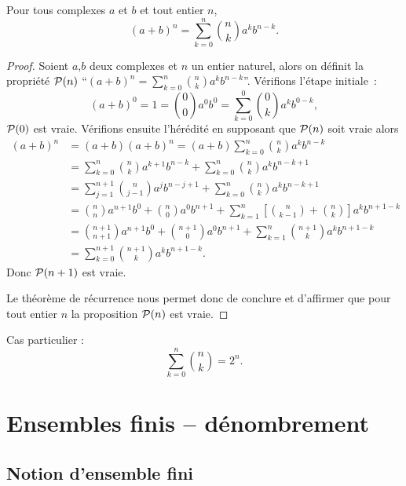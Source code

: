 \begin{prop}
  Pour tous complexes $a$ et $b$ et tout entier $n$,
  \begin{equation}
    (a+b)^n=\sum_{k=0}^n \binom{n}{k}a^kb^{n-k}.
  \end{equation}
\end{prop}
\begin{proof}
  Soient $a$,$b$ deux complexes et $n$ un entier naturel, alors on définit la propriété $\P(n)$ ``$(a+b)^n=\sum_{k=0}^n \binom{n}{k}a^kb^{n-k}$''. Vérifions l'étape initiale~:
\begin{equation}
  (a+b)^0=1=\binom{0}{0}a^0b^0=\sum_{k=0}^0 \binom{0}{k}a^kb^{0-k},
\end{equation}
$\P(0)$ est vraie. Vérifions ensuite l'hérédité en supposant que $\P(n)$ soit vraie alors
\begin{align}
  (a+b)^n&=(a+b)(a+b)^n=(a+b)\sum_{k=0}^n \binom{n}{k}a^kb^{n-k}\\
  &=\sum_{k=0}^n \binom{n}{k}a^{k+1}b^{n-k}+\sum_{k=0}^n \binom{n}{k}a^kb^{n-k+1}\\
  &=\sum_{j=1}^{n+1} \binom{n}{j-1}a^{j}b^{n-j+1}+\sum_{k=0}^n \binom{n}{k}a^kb^{n-k+1}\\
  &=\binom{n}{n}a^{n+1}b^0 +\binom{n}{0}a^0b^{n+1} + \sum_{k=1}^{n}\left[\binom{n}{k-1}+\binom{n}{k}\right]a^kb^{n+1-k}\\
  &=\binom{n+1}{n+1}a^{n+1}b^0+\binom{n+1}{0}a^0b^{n+1}+ \sum_{k=1}^{n}\binom{n+1}{k}a^kb^{n+1-k}\\
  &=\sum_{k=0}^{n+1}\binom{n+1}{k}a^kb^{n+1-k}.
\end{align}
Donc $\P(n+1)$ est vraie.

Le théorème de récurrence nous permet donc de conclure et d'affirmer que pour tout entier $n$ la proposition $\P(n)$ est vraie.
\end{proof}
Cas particulier :
\begin{equation}
  \sum_{k=0}^n \binom{n}{k}=2^n.
\end{equation}

\section{Ensembles finis -- dénombrement}

\subsection{Notion d'ensemble fini}


